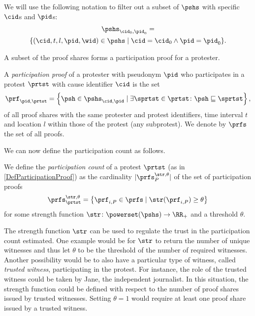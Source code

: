 We will use the following notation to filter out a subset of \(\pshs\) with 
specific \(\cid\)s and \(\pid\)s:
\begin{multline*}
  \pshs_{\cid_0, \pid_0} = \\
  \{(\cid, t, l, \pid, \wid)\in \pshs\mid \cid = \cid_0 \land \pid = \pid_0\}.
\end{multline*}

A subset of the proof shares forms a participation proof for a protester.

\begin{definition}%
  \label{DefParticipationProof}\label{DefParticipationProofs}
  A \emph{participation proof} of a protester with pseudonym \(\pid\) who 
  participates in a protest \(\prtst\) with cause identifier \(\cid\) is the 
  set
  \begin{equation}
    \nonumber
    \prf_{\pid, \prtst} =
    \left\{ \psh \in \pshs_{\cid, \pid} \mid
      \exists \sprtst\in \prtst\colon \psh\sqsubseteq \sprtst \right\},
  \end{equation}
  of all proof shares with the same protester and protest identifiers, time 
  interval \(t\) and location \(l\) within those of the protest (\ie any 
  subprotest).
  We denote by \(\prfs\) the set of all proofs.
\end{definition}

\NewFunction{\str}{\varsigma}

We can now define the participation count as follows.
\begin{definition}%
  \label{DefParticipationCount}
  We define the \emph{participation count} of a protest \(\prtst\) (as in \cref{DefParticipationProof}) as the cardinality 
  \(|\prfs_{P}^{\str,\theta}|\) of the set of participation proofs \[
    \prfs_{\prtst}^{\str,\theta} = \left\{ \prf_{i,P} \in \prfs \mid
      \str(\prf_{i,P})\geq \theta \right\}
  \] for some strength function \(\str\colon \powerset(\pshs)\to \RR_+\) and a 
  threshold \(\theta\).
\end{definition}

The strength function \(\str\) can be used to regulate the trust in the participation count estimated.
One example would be for \(\str\) to return the number of unique witnesses and thus let \(\theta\) to be the threshold of the number of required witnesses.
Another possibility would be to also have a particular type of witness, called \emph{trusted witness}, participating in the protest. 
For instance, the role of the trusted witness could be taken by Jane, the independent journalist. 
In this situation, the strength function could be defined with respect to the number of proof shares issued by trusted witnesses.
Setting \(\theta = 1\) would require at least one proof share issued by a trusted witness.
